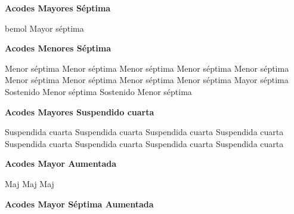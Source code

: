 \clearpage
\textbf{Acodes Mayores S\'eptima}
\vskip 25pt

\small
{} \qquad\qquad {} \qquad\qquad {} \qquad\qquad
\vskip 25pt
 \qquad\qquad {} \qquad\qquad {}
\vskip 25pt
  \qquad\qquad {} bemol Mayor s\'eptima
\vskip 25pt
 \qquad\qquad {} \qquad\qquad
\normalsize
\vskip 20pt

\textbf{Acodes Menores S\'eptima}
\vskip 25pt

\small
{} Menor s\'eptima \qquad\qquad
{} Menor s\'eptima \qquad\qquad
{} Menor s\'eptima
\vskip 25pt
 Menor s\'eptima \qquad\qquad
{} Menor s\'eptima \qquad\qquad
{} Menor s\'eptima
\vskip 25pt
 Menor s\'eptima \qquad\qquad
{} Menor s\'eptima \qquad\qquad
{} Menor s\'eptima
\vskip 25pt
 Mayor s\'eptima \qquad\qquad
{} Sostenido Menor s\'eptima \qquad\qquad
{} Sostenido Menor s\'eptima
\normalsize

\vskip 20pt

\textbf{Acodes Mayores Suspendido cuarta}
\vskip 25pt

\small
{} Suspendida cuarta  \qquad\qquad
{} Suspendida cuarta \qquad\qquad
{} Suspendida cuarta
\vskip 25pt
 Suspendida cuarta \qquad\qquad
{} Suspendida cuarta \qquad\qquad
{} Suspendida cuarta
\vskip 25pt
 Suspendida cuarta \qquad\qquad
{} Suspendida cuarta
\normalsize

\vskip 20pt
\textbf{Acodes Mayor Aumentada}
\vskip 25pt

\small
{} Maj  \qquad\qquad
{} Maj
 Maj
\normalsize

\vskip 20pt
\textbf{Acodes Mayor S\'eptima Aumentada}
\vskip 25pt

